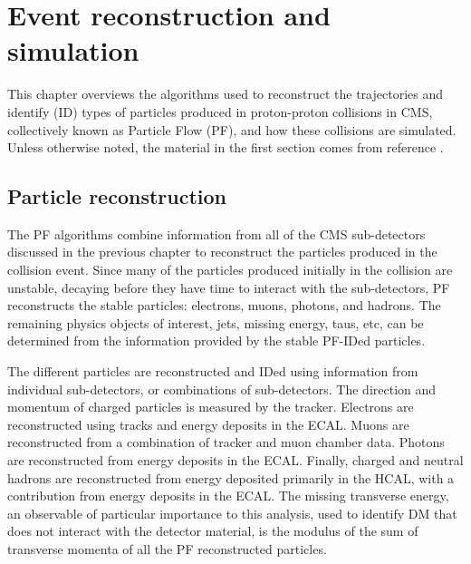 \chapter{Event reconstruction and simulation}

This chapter overviews the algorithms used to reconstruct the trajectories and identify (ID) types of particles produced in proton-proton collisions in CMS, collectively known as Particle Flow (PF), and how these collisions are simulated. Unless otherwise noted, the material in the first section comes from reference \cite{CMS:2009nxa}.

\section{Particle reconstruction}

The PF algorithms combine information from all of the CMS sub-detectors discussed in the previous chapter to reconstruct the particles produced in the collision event. Since many of the particles produced initially in the collision are unstable, decaying before they have time to interact with the sub-detectors, PF reconstructs the stable particles: electrons, muons, photons, and hadrons. The remaining physics objects of interest, jets, missing energy, taus, etc, can be determined from the information provided by the stable PF-IDed particles. 

\indent The different particles are reconstructed and IDed using information from individual sub-detectors, or combinations of sub-detectors. The direction and momentum of charged particles is measured by the tracker. Electrons are reconstructed using tracks and energy deposits in the ECAL. Muons are reconstructed from a combination of tracker and muon chamber data. Photons are reconstructed from energy deposits in the ECAL. Finally, charged and neutral hadrons are reconstructed from energy deposited primarily in the HCAL, with a contribution from energy deposits in the ECAL. The missing transverse energy, an observable of particular importance to this analysis, used to identify DM that does not interact with the detector material, is the modulus of the sum of transverse momenta of all the PF reconstructed particles. 

